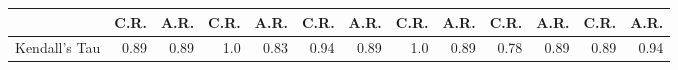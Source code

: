 \begin{table}[]
\begin{tabular}{lrrrrrrrrrrrr}
                                                                                     & \multicolumn{1}{c}{C.R.}                                                      & \multicolumn{1}{c}{A.R.}                                                      & \multicolumn{1}{c}{C.R.}                                                      & \multicolumn{1}{c}{A.R.}                                                      & \multicolumn{1}{c}{C.R.}                                                      & \multicolumn{1}{c}{A.R.}                                                      & \multicolumn{1}{c}{C.R.}                                                      & \multicolumn{1}{c}{A.R.}                                                      & \multicolumn{1}{c}{C.R.}                                                      & \multicolumn{1}{c}{A.R.}                                                      & \multicolumn{1}{c}{C.R.}                                                      & \multicolumn{1}{c}{A.R.}                                                                                                                                                                                                                                                                                                                                                                                                                                                                                                                                                                                                                                                                                                                                                                                                                                                                                                                                                                                             \\
\midrule
Kendall's Tau                                                                        & 0.89                                                                          & 0.89                                                                          & 1.0                                                                           & 0.83                                                                          & 0.94                                                                          & 0.89                                                                          & 1.0                                                                           & 0.89                                                                          & 0.78                                                                          & 0.89                                                                          & 0.89                                                                          & 0.94                                                                          

\end{tabular}
\end{table}
